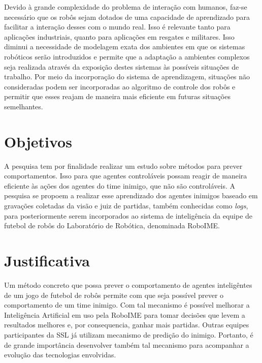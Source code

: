 
Devido à grande complexidade do problema de interação com humanos, faz-se necessário
que os robôs sejam dotados de uma capacidade de aprendizado para facilitar a interação
desses com o mundo real. Isso é relevante tanto para aplicações industriais, quanto para
aplicações em resgates e militares. Isso diminui a necessidade de modelagem
exata dos ambientes em que os sistemas robóticos serão introduzidos e permite que
a adaptação a ambientes complexos seja realizada através da exposição destes sistemas
às possíveis situações de trabalho. Por meio da incorporação do sistema de
aprendizagem, situações não consideradas podem ser incorporadas ao algoritmo de
controle dos robôs e permitir que esses reajam de maneira mais eficiente em futuras
situações semelhantes.

\section{Objetivos}

A pesquisa tem por finalidade realizar um estudo sobre métodos para prever comportamentos.
Isso para que agentes controláveis
possam reagir de maneira eficiente às ações dos agentes do time inimigo, que não são controláveis.
A pesquisa se propoem a realizar esse aprendizado dos agentes inimigos baseado em gravações
coletadas da visão e juiz de partidas, também conhecidas como \textit{logs}, para posteriormente
serem incorporados ao sistema de inteligência da equipe de futebol de robôs do Laboratório
de Robótica, denominada RoboIME.

\section{Justificativa}

Um método concreto que possa prever o comportamento de agentes inteligêntes de um jogo de
futebol de robôs permite com que seja possível prever o comportamento de um time inimigo.
Com tal mecanismo é possível melhorar a Inteligência Artificial em uso pela RoboIME
para tomar decisões que levem a resultados melhores e, por consequencia, ganhar mais partidas.
Outras equipes participantes da SSL já utilizam mecanismo de predição do inimigo.
Portanto, é de grande importância desenvolver também tal mecanismo para acompanhar a evolução
das tecnologias envolvidas.

